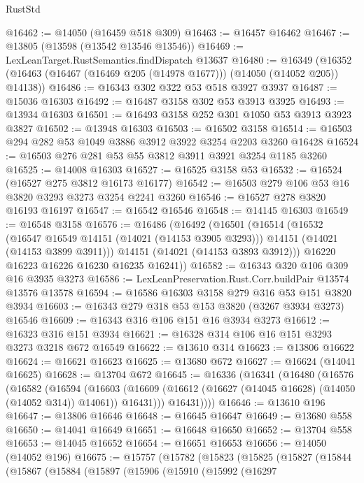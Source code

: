 \begin{lexlean}{RustStd}
\begin{coremodule}
{\begin{coremodule}
{{{{{{{{{{{{{{{{{{{{{{{{{{{{{{{{{{{{{{{@16462 := @14050 (@16459 @518 @309)
@16463 := @16457 @16462
@16467 := @13805 (@13598 (@13542 @13546 @13546))
@16469 := LexLeanTarget.RustSemantics.findDispatch @13637
@16480 := @16349
    (@16352 (@16463 (@16467 (@16469 @205 (@14978 @1677))) (@14050 (@14052 @205)) @14138))
@16486 := @16343 @302 @322 @53 @518 @3927 @3937
@16487 := @15036 @16303
@16492 := @16487 @3158 @302 @53 @3913 @3925
@16493 := @13934 @16303
@16501 := @16493 @3158 @252 @301 @1050 @53 @3913 @3923 @3827
@16502 := @13948 @16303
@16503 := @16502 @3158
@16514 := @16503 @294 @282 @53 @1049 @3886 @3912 @3922 @3254 @2203 @3260 @16428
@16524 := @16503 @276 @281 @53 @55 @3812 @3911 @3921 @3254 @1185 @3260
@16525 := @14008 @16303
@16527 := @16525 @3158 @53
@16532 := @16524 (@16527 @275 @3812 @16173 @16177)
@16542 := @16503 @279 @106 @53 @16 @3820 @3293 @3273 @3254 @2241 @3260
@16546 := @16527 @278 @3820 @16193 @16197
@16547 := @16542 @16546
@16548 := @14145 @16303
@16549 := @16548 @3158
@16576 := @16486
    (@16492
      (@16501
        (@16514
          (@16532
            (@16547 @16549 @14151 (@14021 (@14153 @3905 @3293)))
            @14151
            (@14021 (@14153 @3899 @3911)))
          @14151
          (@14021 (@14153 @3893 @3912)))
        @16220
        @16223
        @16226
        @16230
        @16235
        @16241))
@16582 := @16343 @320 @106 @309 @16 @3935 @3273
@16586 := LexLeanPreservation.Rust.Corr.buildPair @13574 @13576 @13578
@16594 := @16586 @16303 @3158 @279 @316 @53 @151 @3820 @3934
@16603 := @16343 @279 @318 @53 @153 @3820 (@3267 @3934 @3273) @16546
@16609 := @16343 @316 @106 @151 @16 @3934 @3273
@16612 := @16323 @316 @151 @3934
@16621 := @16328 @314 @106 @16 @151 @3293 @3273 @3218 @672 @16549
@16622 := @13610 @314
@16623 := @13806 @16622
@16624 := @16621 @16623
@16625 := @13680 @672
@16627 := @16624 (@14041 @16625)
@16628 := @13704 @672
@16645 := @16336
    (@16341
      (@16480
        (@16576
          (@16582
            (@16594
              (@16603
                (@16609 (@16612 (@16627 (@14045 @16628) (@14050 (@14052 @314)) @14061)) @16431)))
            @16431))))
@16646 := @13610 @196
@16647 := @13806 @16646
@16648 := @16645 @16647
@16649 := @13680 @558
@16650 := @14041 @16649
@16651 := @16648 @16650
@16652 := @13704 @558
@16653 := @14045 @16652
@16654 := @16651 @16653
@16656 := @14050 (@14052 @196)
@16675 := @15757
    (@15782
      (@15823
        (@15825
          (@15827
            (@15844
              (@15867
                (@15884
                  (@15897
                    (@15906
                      (@15910
                        (@15992
                          (@16297
}}}}}}}}}}}}}}}}}}}}}}}}}}}}}}}}}}}}}}}
\end{coremodule}}
\end{coremodule}
\end{lexlean}
